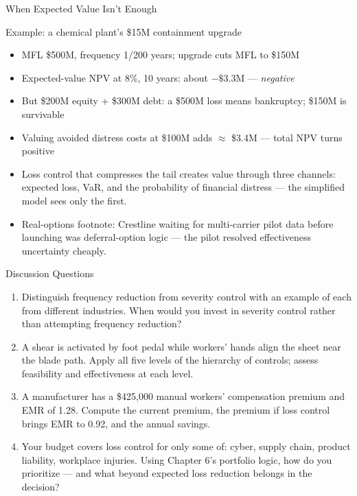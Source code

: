 \documentclass[11pt, aspectratio=169]{beamer}
\begin{document}
\begin{frame}{When Expected Value Isn't Enough}
\begin{exampleblock}{Example: a chemical plant's \$15M containment upgrade}
\begin{itemize}
  \item MFL \$500M, frequency 1/200 years; upgrade cuts MFL to \$150M
  \item Expected-value NPV at 8\%, 10 years: about $-\$3.3$M --- \emph{negative}
  \item But \$200M equity + \$300M debt: a \$500M loss means bankruptcy; \$150M is survivable
  \item Valuing avoided distress costs at \$100M adds $\approx$ \$3.4M --- total NPV turns positive
\end{itemize}
\end{exampleblock}
\medskip
\begin{itemize}
  \item Loss control that compresses the tail creates value through three channels: expected loss, VaR, and the probability of \alert{financial distress} --- the simplified model sees only the first.
  \item Real-options footnote: Crestline waiting for multi-carrier pilot data before launching was deferral-option logic --- the pilot resolved effectiveness uncertainty cheaply.
\end{itemize}
\end{frame}

\begin{frame}{Discussion Questions}
\begin{enumerate}
  \item Distinguish frequency reduction from severity control with an example of each from different industries. When would you invest in severity control rather than attempting frequency reduction?
  \item A shear is activated by foot pedal while workers' hands align the sheet near the blade path. Apply all five levels of the hierarchy of controls; assess feasibility and effectiveness at each level.
  \item A manufacturer has a \$425{,}000 manual workers' compensation premium and EMR of 1.28. Compute the current premium, the premium if loss control brings EMR to 0.92, and the annual savings.
  \item Your budget covers loss control for only some of: cyber, supply chain, product liability, workplace injuries. Using Chapter 6's portfolio logic, how do you prioritize --- and what beyond expected loss reduction belongs in the decision?
\end{enumerate}
\end{frame}
\end{document}
